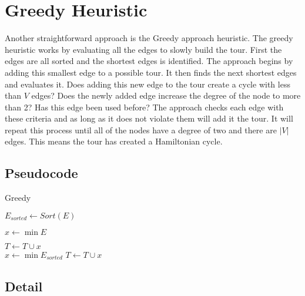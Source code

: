 \documentclass{article}
\author{William Davies, Trent Louie}
\begin{document}
\section{Greedy Heuristic}

Another straightforward approach is the Greedy approach heuristic. The greedy
heuristic works by evaluating all the edges to slowly build the tour. First the
edges are all sorted and the shortest edges is identified. The approach begins
by adding this smallest edge to a possible tour. It then finds the next shortest
edges and evaluates it. Does adding this new edge to the tour create a cycle
with less than $V$ edges? Does the newly added edge increase the degree of the
node to more than 2? Has this edge been used before? The approach checks each
edge with these criteria and as long as it does not violate them will add it the
tour. It will repeat this process until all of the nodes have a degree of two
and there are $|V|$ edges. This means the tour has created a Hamiltonian cycle.


\subsection{Pseudocode}

\FloatBarrier

\begin{algorithm}
  \caption{Greedy}
  \label{alg_greedy}
  \begin{algorithmic}[1]

    \State $E_{\textit{sorted}} \gets \textit{Sort}(E)$

    \State $x \gets \min E$

    \State $T \gets T \cup {x}$
    \\
      \State $x \gets \min E_{\textit{sorted}}$
            \State $T \gets T \cup x$
          \EndIf
        \EndIf
      \EndIf
    \EndWhile
    \\
    \EndProcedure
  \end{algorithmic}
\end{algorithm}

\FloatBarrier

\subsection{Detail}
\end{document}
